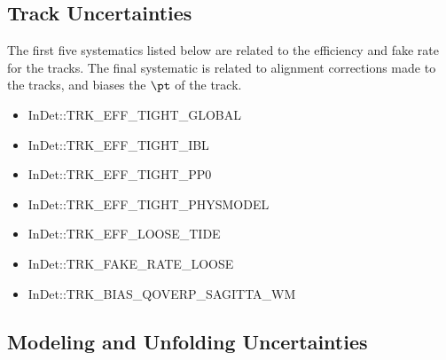 \subsection{Track Uncertainties}
The first five systematics listed below are related to the efficiency and fake rate for the tracks. The final systematic is related to alignment corrections made to the tracks, and biases the $\pt$ of the track. 
\begin{itemize}
  \item InDet::TRK\_EFF\_TIGHT\_GLOBAL
  \item InDet::TRK\_EFF\_TIGHT\_IBL
  \item InDet::TRK\_EFF\_TIGHT\_PP0
  \item InDet::TRK\_EFF\_TIGHT\_PHYSMODEL
  \item InDet::TRK\_EFF\_LOOSE\_TIDE
  \item InDet::TRK\_FAKE\_RATE\_LOOSE
  \item InDet::TRK\_BIAS\_QOVERP\_SAGITTA\_WM
\end{itemize}

\subsection{Modeling and Unfolding Uncertainties}